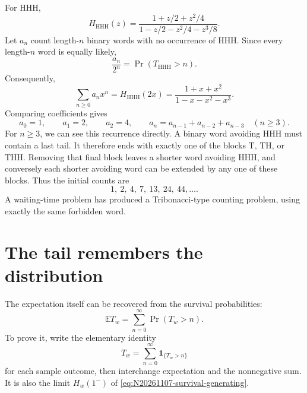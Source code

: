 For \(\mathrm{HHH}\),
\[
 H_{\mathrm{HHH}}(z)
 =\frac{1+z/2+z^2/4}
 {1-z/2-z^2/4-z^3/8}.
\]
Let \(a_n\) count length-\(n\) binary words with no occurrence of \(\mathrm{HHH}\). Since every length-\(n\) word is equally likely,
\[
 \frac{a_n}{2^n}=\Pr(T_{\mathrm{HHH}}>n).
\]
Consequently,
\begin{equation}
 \sum_{n\geq0}a_nx^n
 =H_{\mathrm{HHH}}(2x)
 =\frac{1+x+x^2}{1-x-x^2-x^3}.
 \label{eq:N20261107-tribonacci}
\end{equation}
Comparing coefficients gives
\[
 a_0=1,\qquad a_1=2,\qquad a_2=4,\qquad
 a_n=a_{n-1}+a_{n-2}+a_{n-3}\quad(n\geq3).
\]
For \(n\geq3\), we can see this recurrence directly. A binary word avoiding \(\mathrm{HHH}\) must contain a last tail. It therefore ends with exactly one of the blocks \(\mathrm T\), \(\mathrm{TH}\), or \(\mathrm{THH}\). Removing that final block leaves a shorter word avoiding \(\mathrm{HHH}\), and conversely each shorter avoiding word can be extended by any one of these blocks. Thus the initial counts are
\[
 1,\ 2,\ 4,\ 7,\ 13,\ 24,\ 44,\ldots.
\]
A waiting-time problem has produced a Tribonacci-type counting problem, using exactly the same forbidden word.

\section{The tail remembers the distribution}

The expectation itself can be recovered from the survival probabilities:
\begin{equation}
 \mathbb ET_w
 =\sum_{n=0}^{\infty}\Pr(T_w>n).
 \label{eq:N20261107-tail-sum}
\end{equation}
To prove it, write the elementary identity
\[
 T_w=\sum_{n=0}^{\infty}\mathbf1_{\{T_w>n\}}
\]
for each sample outcome, then interchange expectation and the nonnegative sum. It is also the limit \(H_w(1^-)\) of \eqref{eq:N20261107-survival-generating}.


